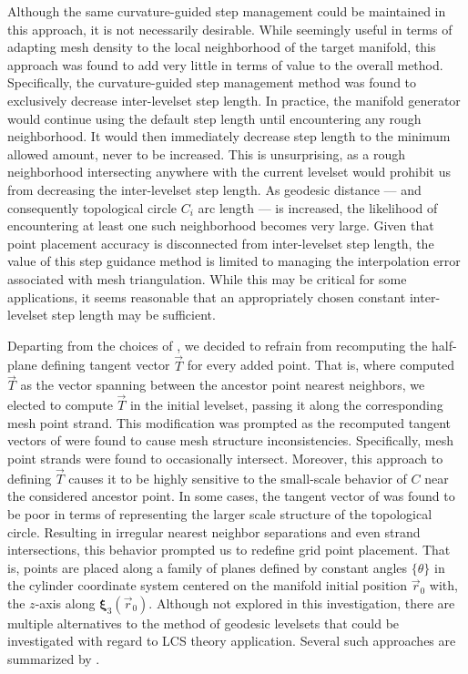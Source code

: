 Although the same curvature-guided step management could be maintained in this approach, it is not necessarily desirable. While seemingly useful in terms of adapting mesh density to the local neighborhood of the target manifold, this approach was found to add very little in terms of value to the overall method. Specifically, the curvature-guided step management method was found to exclusively decrease inter-levelset step length. In practice, the manifold generator would continue using the default step length until encountering any rough neighborhood. It would then immediately decrease step length to the minimum allowed amount, never to be increased. This is unsurprising, as a rough neighborhood intersecting anywhere with the current levelset would prohibit us from decreasing the inter-levelset step length. As geodesic distance --- and consequently topological circle $C_i$ arc length --- is increased, the likelihood of encountering at least one such neighborhood becomes very large. Given that point placement accuracy is disconnected from inter-levelset step length, the value of this step guidance method is limited to managing the interpolation error associated with mesh triangulation. While this may be critical for some applications, it seems reasonable that an appropriately chosen constant inter-levelset step length may be sufficient.

Departing from the choices of \cite{GeodesicLevelSets}, we decided to refrain from recomputing the half-plane defining tangent vector $\vec{T}$ for every added point. That is, where \cite{GeodesicLevelSets} computed $\vec{T}$ as the vector spanning between the ancestor point nearest neighbors, we elected to compute $\vec{T}$ in the initial levelset, passing it along the corresponding mesh point strand. This modification was prompted as the recomputed tangent vectors of \cite{GeodesicLevelSets} were found to cause mesh structure inconsistencies. Specifically, mesh point strands were found to occasionally intersect. Moreover, this approach to defining $\vec{T}$ causes it to be highly sensitive to the small-scale behavior of $C$ near the considered ancestor point. In some cases, the tangent vector of \cite{GeodesicLevelSets} was found to be poor in terms of representing the larger scale structure of the topological circle. Resulting in irregular nearest neighbor separations and even strand intersections, this behavior prompted us to redefine grid point placement. That is, points are placed along a family of planes defined by constant angles $\{\theta\}$ in the cylinder coordinate system centered on the manifold initial position $\vec{r}_0$ with, the $z$-axis along $\bm{\xi}_3(\vec{r}_0)$. Although not explored in this investigation, there are multiple alternatives to the method of geodesic levelsets that could be investigated with regard to LCS theory application. Several such approaches are summarized by \cite{Survey}.

